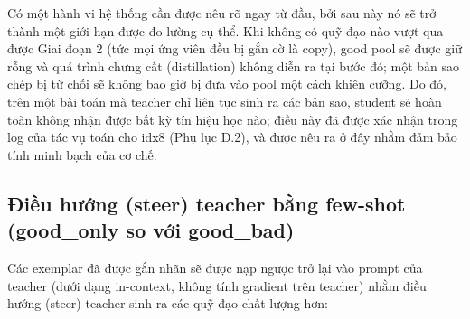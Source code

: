 Có một hành vi hệ thống cần được nêu rõ ngay từ đầu, bởi sau này nó sẽ trở thành một giới hạn được đo lường cụ thể. Khi không có quỹ đạo nào vượt qua được Giai đoạn 2 (tức mọi ứng viên đều bị gắn cờ là copy), good pool sẽ được giữ rỗng và quá trình chưng cất (distillation) không diễn ra tại bước đó; một bản sao chép bị từ chối sẽ không bao giờ bị đưa vào pool một cách khiên cưỡng. Do đó, trên một bài toán mà teacher chỉ liên tục sinh ra các bản sao, student sẽ hoàn toàn không nhận được bất kỳ tín hiệu học nào; điều này đã được xác nhận trong log của tác vụ toán cho idx8 (Phụ lục D.2), và được nêu ra ở đây nhằm đảm bảo tính minh bạch của cơ chế.

\subsection{Điều hướng (steer) teacher bằng few-shot (good\_only so với good\_bad)}\label{few-shot-teacher-steering-good_only-vs-good_bad}

Các exemplar đã được gắn nhãn sẽ được nạp ngược trở lại vào prompt của teacher (dưới dạng in-context, không tính gradient trên teacher) nhằm điều hướng (steer) teacher sinh ra các quỹ đạo chất lượng hơn:

